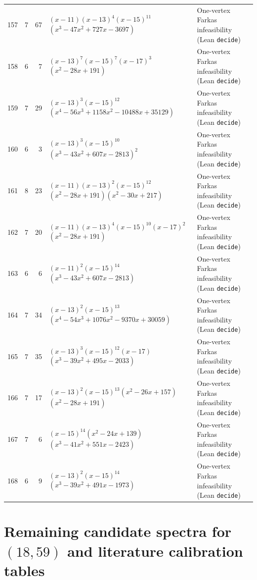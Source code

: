 \documentclass[11pt,reqno]{amsart}
\theoremstyle{definition}
\theoremstyle{remark}
\numberwithin{equation}{section}
\numberwithin{table}{section}
\begin{document}
{\begin{longtable}{@{}rrr>{\raggedright\arraybackslash}p{2.50in}>{\raggedright\arraybackslash}p{2.30in}@{}}
157 & 7 & 67 & $(x-11)$\allowbreak $(x-13)^4$\allowbreak $(x-15)^{11}$\allowbreak $(x^3-47x^2+727x-3697)$ & One-vertex Farkas infeasibility (Lean \texttt{decide}) \\
158 & 6 & 7 & $(x-13)^7$\allowbreak $(x-15)^7$\allowbreak $(x-17)^3$\allowbreak $(x^2-28x+191)$ & One-vertex Farkas infeasibility (Lean \texttt{decide}) \\
159 & 7 & 29 & $(x-13)^3$\allowbreak $(x-15)^{12}$\allowbreak $(x^4-56x^3+1158x^2-10488x+35129)$ & One-vertex Farkas infeasibility (Lean \texttt{decide}) \\
160 & 6 & 3 & $(x-13)^3$\allowbreak $(x-15)^{10}$\allowbreak $(x^3-43x^2+607x-2813)^2$ & One-vertex Farkas infeasibility (Lean \texttt{decide}) \\
161 & 8 & 23 & $(x-11)$\allowbreak $(x-13)^2$\allowbreak $(x-15)^{12}$\allowbreak $(x^2-28x+191)$\allowbreak $(x^2-30x+217)$ & One-vertex Farkas infeasibility (Lean \texttt{decide}) \\
162 & 7 & 20 & $(x-11)$\allowbreak $(x-13)^4$\allowbreak $(x-15)^{10}$\allowbreak $(x-17)^2$\allowbreak $(x^2-28x+191)$ & One-vertex Farkas infeasibility (Lean \texttt{decide}) \\
163 & 6 & 6 & $(x-11)^2$\allowbreak $(x-15)^{14}$\allowbreak $(x^3-43x^2+607x-2813)$ & One-vertex Farkas infeasibility (Lean \texttt{decide}) \\
164 & 7 & 34 & $(x-13)^2$\allowbreak $(x-15)^{13}$\allowbreak $(x^4-54x^3+1076x^2-9370x+30059)$ & One-vertex Farkas infeasibility (Lean \texttt{decide}) \\
165 & 7 & 35 & $(x-13)^3$\allowbreak $(x-15)^{12}$\allowbreak $(x-17)$\allowbreak $(x^3-39x^2+495x-2033)$ & One-vertex Farkas infeasibility (Lean \texttt{decide}) \\
166 & 7 & 17 & $(x-13)^2$\allowbreak $(x-15)^{13}$\allowbreak $(x^2-26x+157)$\allowbreak $(x^2-28x+191)$ & One-vertex Farkas infeasibility (Lean \texttt{decide}) \\
167 & 7 & 6 & $(x-15)^{14}$\allowbreak $(x^2-24x+139)$\allowbreak $(x^3-41x^2+551x-2423)$ & One-vertex Farkas infeasibility (Lean \texttt{decide}) \\
168 & 6 & 9 & $(x-13)^2$\allowbreak $(x-15)^{14}$\allowbreak $(x^3-39x^2+491x-1973)$ & One-vertex Farkas infeasibility (Lean \texttt{decide}) \\
\end{longtable}
}

\section{Remaining candidate spectra for \texorpdfstring{$(18, 59)$}{(18, 59)} and literature calibration tables}\label{app:census_18_59}
\end{document}
